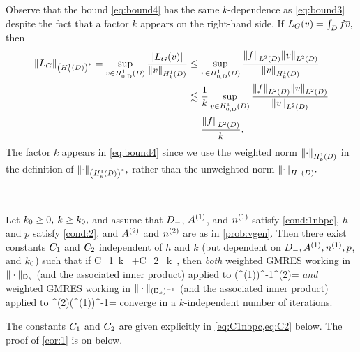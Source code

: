 \label{rem:yesitis}
Observe that the bound \cref{eq:bound4} has the same $k$-dependence as \cref{eq:bound3} despite the fact that a factor $k$ appears on the right-hand side. If $L_{G}(v) = \int_{D} f\overline{v},$ then
\begin{align*}
  \NHokDs{\LG} = \sup_{v \in \HozDD} \frac{\abs{\LG(v)}}{\NHokD{v}} &\leq\sup_{v \in \HozDD} \frac{\NLtD{f}\NLtD{v}}{\NHokD{v}}\\
  &\lesssim \frac1k \sup_{v \in \HozDD} \frac{\NLtD{f}\NLtD{v}}{\NLtD{v}}\\
  &= \frac{\NLtD{f}}k.
\end{align*}
The factor $k$ appears in \cref{eq:bound4} since we use the weighted norm $\NHokD{\cdot}$ in the definition of $\NHokDs{\cdot},$ rather than the unweighted norm $\NHoD{\cdot}.$
\ere

\label{cor:1}

\

\noindent Let $k_{0} \geq 0,$ $k \geq k_{0},$ and assume that $D_{-}$, ${A}^{(1)}$, and ${n}^{(1)}$ satisfy \cref{cond:1nbpc}, $h$ and $p$ satisfy \cref{cond:2}, and ${A}^{(2)}$ and ${n}^{(2)}$ are as in \cref{prob:vgen}. Then there exist constants $C_{1}$ and $C_{2}$  independent of $h$ and $k$ (but dependent on $D_{-}, {A}^{(1)}, {n}^{(1)}, p$, and $k_{0}$) such that if 
\beq\label{eq:cond}
C_1 \,k \,\NLiDop{\Aso-\Ast} +C_2 \, k\, \NLiDRR{\nso-\nst}
\leq {},
\eeq
then \emph{both} weighted GMRES working in $\|\cdot\|_{\mathsf{D}_k}$ (and the associated inner product) applied to 
\beq\label{eq:pcsystem1}
(\Amat^{(1)})^{-1}\Amat^{(2)}\uvec = \fvec
\eeq
\emph{and} weighted GMRES working in $\|\cdot\|_{(\mathsf{D}_k)^{-1}}$ (and the associated inner product) applied to 
\beq\label{eq:pcsystem2}
\Amat^{(2)}(\Amat^{(1)})^{-1}\vvec = \fvec
\eeq
 converge in a $k$-independent number of iterations.
 \enth

The constants $C_{1}$ and $C_{2}$ are given explicitly  in \cref{eq:C1nbpc,eq:C2} below. The proof of \cref{cor:1} is on  below.

\label{cor:1a}

\

